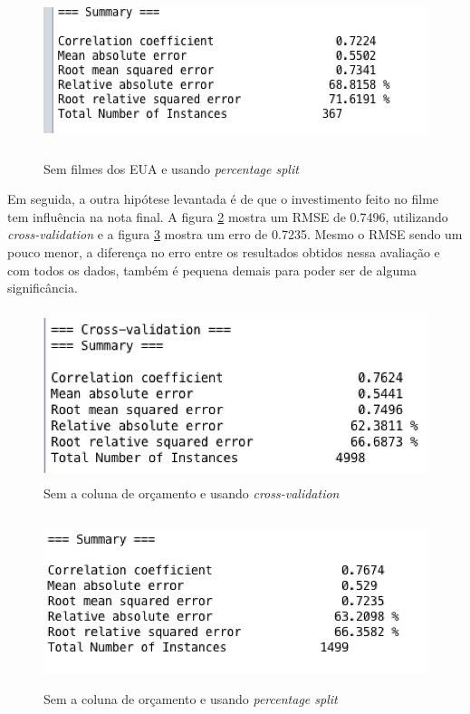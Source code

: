 \begin{figure}[H]
\centering
\includegraphics[height=5cm]{imagens/sem_usa_split.png}
\caption{Sem filmes dos EUA e usando \textit{percentage split}}
\label{nousasplit}
\end{figure}


Em seguida, a outra hipótese levantada é de que o investimento feito no filme tem influência na nota final. A figura \ref{nobudgetcv} mostra um RMSE de 0.7496, utilizando \textit{cross-validation} e a figura \ref{nobudgetsplit} mostra um erro de 0.7235. Mesmo o RMSE sendo um pouco menor, a diferença no erro entre os resultados obtidos nessa avaliação e com todos os dados, também é pequena demais para poder ser de alguma significância.

\begin{figure}[H]
\centering
\includegraphics[height=5cm]{imagens/no_budget_cv.png}
\caption{Sem a coluna de orçamento e usando \textit{cross-validation}}
\label{nobudgetcv}
\end{figure}

\begin{figure}[H]
\centering
\includegraphics[height=5cm]{imagens/no_budget_split.png}
\caption{Sem a coluna de orçamento e usando \textit{percentage split}}
\label{nobudgetsplit}
\end{figure}


